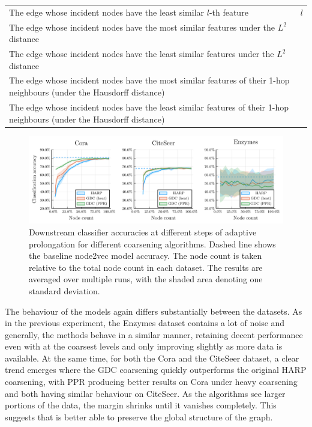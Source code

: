 \begin{table}
\begin{tabularx}{\linewidth}{Xr}
        The edge whose incident nodes have the least similar \( l \)-th feature                                                   & \( l \)                \\
        The edge whose incident nodes have the most similar features under the \( L^2 \) distance                                 &                        \\
        The edge whose incident nodes have the least similar features under the \( L^2 \) distance                             &                        \\
        The edge whose incident nodes have the most similar features of their 1-hop neighbours (under the Hausdorff distance)     &                        \\
        The edge whose incident nodes have the least similar features of their 1-hop neighbours (under the Hausdorff distance) &                        \\
        \bottomrule
    \end{tabularx}
\end{table}

\begin{figure}
  \centering
  \includegraphics[width=\linewidth]{images/coarsening-algorithms/coarsening-algorithms.pdf}
  \caption{Downstream classifier accuracies at different steps of adaptive prolongation for different coarsening algorithms. Dashed line shows the baseline node2vec model accuracy. The node count is taken relative to the total node count in each dataset. The results are averaged over multiple runs, with the shaded area denoting one standard deviation.}
  \label{fig:coarsening-algorithms}
\end{figure}

The behaviour of the models again differs substantially between the datasets. As in the previous experiment, the Enzymes dataset contains a lot of noise and generally, the methods behave in a similar manner, retaining decent performance even with at the coarsest levels and only improving slightly as more data is available. At the same time, for both the Cora and the CiteSeer dataset, a clear trend emerges where the GDC coarsening quickly outperforms the original HARP coarsening, with PPR producing better results on Cora under heavy coarsening and both having similar behaviour on CiteSeer. As the algorithms see larger portions of the data, the margin shrinks until it vanishes completely. This suggests that is better able to preserve the global structure of the graph.
